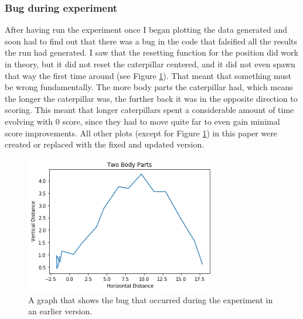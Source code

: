 \documentclass[12pt,oneside,listof=totoc,paper=a4,headings=small]{scrbook}
\begin{document}
\subsubsection{Bug during experiment} %
After having run the experiment once I began plotting the data generated and soon had to find out that there was a bug in the code that falsified all the results the run had generated. I saw that the resetting function for the position did work in theory, but it did not reset the caterpillar centered, and it did not even spawn that way the first time around (see Figure \ref{fig:TwoPartsBugged}). That meant that something must be wrong fundamentally.
The more body parts the caterpillar had, which means the longer the caterpillar was, the further back it was in the opposite direction to scoring. This meant that longer caterpillars spent a considerable amount of time evolving with 0 score, since they had to move quite far to even gain minimal score improvements.
All other plots (except for Figure \ref{fig:TwoPartsBugged}) in this paper were created or replaced with the fixed and updated version.
\newpage
\begin{figure}[h!]
\centering
\includegraphics[width=0.75\textwidth,height=0.75\textheight,keepaspectratio]{images/2parts_bug.png}
\caption{A graph that shows the bug that occurred during the experiment in an earlier version.}
\label{fig:TwoPartsBugged}
\end{figure}
\end{document}
